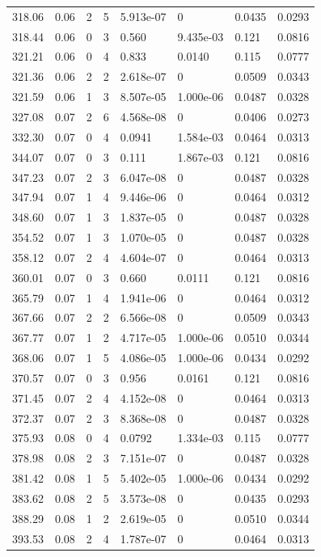 \documentclass[preview]{standalone}
\begin{document}
{{{{\begin{tabular}{L{1.2cm}C{1.2cm} C{0.3cm}C{0.5cm} C{1.4cm}C{1.4cm} C{1.4cm}C{1.4cm}}
  318.06  &  0.06  & 2     &  5 &  5.913e-07  & 0  & 0.0435 &  0.0293   \\ 
  318.44  &  0.06  & 0     &  3 &  0.560  & 9.435e-03  & 0.121 &  0.0816   \\ 
  321.21  &  0.06  & 0     &  4 &  0.833  & 0.0140  & 0.115 &  0.0777   \\ 
  321.36  &  0.06  & 2     &  2 &  2.618e-07  & 0  & 0.0509 &  0.0343   \\ 
  321.59  &  0.06  & 1     &  3 &  8.507e-05  & 1.000e-06  & 0.0487 &  0.0328   \\ 
  327.08  &  0.07  & 2     &  6 &  4.568e-08  & 0  & 0.0406 &  0.0273   \\ 
  332.30  &  0.07  & 0     &  4 &  0.0941  & 1.584e-03  & 0.0464 &  0.0313   \\ 
  344.07  &  0.07  & 0     &  3 &  0.111  & 1.867e-03  & 0.121 &  0.0816   \\ 
  347.23  &  0.07  & 2     &  3 &  6.047e-08  & 0  & 0.0487 &  0.0328   \\ 
  347.94  &  0.07  & 1     &  4 &  9.446e-06  & 0  & 0.0464 &  0.0312   \\ 
  348.60  &  0.07  & 1     &  3 &  1.837e-05  & 0  & 0.0487 &  0.0328   \\ 
  354.52  &  0.07  & 1     &  3 &  1.070e-05  & 0  & 0.0487 &  0.0328   \\ 
  358.12  &  0.07  & 2     &  4 &  4.604e-07  & 0  & 0.0464 &  0.0313   \\ 
  360.01  &  0.07  & 0     &  3 &  0.660  & 0.0111  & 0.121 &  0.0816   \\ 
  365.79  &  0.07  & 1     &  4 &  1.941e-06  & 0  & 0.0464 &  0.0312   \\ 
  367.66  &  0.07  & 2     &  2 &  6.566e-08  & 0  & 0.0509 &  0.0343   \\ 
  367.77  &  0.07  & 1     &  2 &  4.717e-05  & 1.000e-06  & 0.0510 &  0.0344   \\ 
  368.06  &  0.07  & 1     &  5 &  4.086e-05  & 1.000e-06  & 0.0434 &  0.0292   \\ 
  370.57  &  0.07  & 0     &  3 &  0.956  & 0.0161  & 0.121 &  0.0816   \\ 
  371.45  &  0.07  & 2     &  4 &  4.152e-08  & 0  & 0.0464 &  0.0313   \\ 
  372.37  &  0.07  & 2     &  3 &  8.368e-08  & 0  & 0.0487 &  0.0328   \\ 
  375.93  &  0.08  & 0     &  4 &  0.0792  & 1.334e-03  & 0.115 &  0.0777   \\ 
  378.98  &  0.08  & 2     &  3 &  7.151e-07  & 0  & 0.0487 &  0.0328   \\ 
  381.42  &  0.08  & 1     &  5 &  5.402e-05  & 1.000e-06  & 0.0434 &  0.0292   \\ 
  383.62  &  0.08  & 2     &  5 &  3.573e-08  & 0  & 0.0435 &  0.0293   \\ 
  388.29  &  0.08  & 1     &  2 &  2.619e-05  & 0  & 0.0510 &  0.0344   \\ 
  393.53  &  0.08  & 2     &  4 &  1.787e-07  & 0  & 0.0464 &  0.0313   \\ 
\hline 
\end{tabular} 

}}}}
\end{document}
